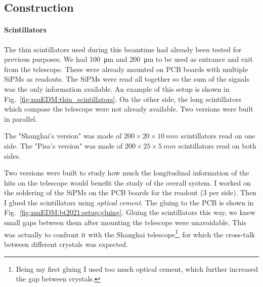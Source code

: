 \begin{refsection}
    \subsection{Construction}
        \paragraph{Scintillators}
        The thin scintillators used during this beamtime had already been tested for previous purposes. 
        We had \SI{100}{\micro m} and \SI{200}{\micro m} to be used as entrance and exit from the telescope.
        These were already mounted on PCB boards with multiple SiPMs as readouts. The SiPMs were read all together so the sum of the signals was the only information available.
        An example of this setup is shown in Fig.~\ref{fig:muEDM:thin_scintillators}.
        On the other side, the long scintillators which compose the telescope were not already available.
        Two versions were built in parallel.
        \begin{outline}
            \1 The "Shanghai's version" was made of $200\times 20\times\SI{10}{mm}$ scintillators read on one side.
            \1 The "Pisa's version" was made of $200\times 25\times\SI{5}{mm}$ scintillators read on both sides.
        \end{outline}
        Two versions were built to study how much the longitudinal information of the hits on the telescope would benefit the study of the overall system.
        I worked on the soldering of the SiPMs on the PCB boards for the readout (3 per side).
        Then I glued the scintillators using \textit{optical cement}.
        The gluing to the PCB is shown in Fig.~\ref{fig:muEDM:bt2021:setup:gluing}.
        Gluing the scintillators this way, we knew small gaps between them after mounting the telescope were unavoidable. 
        This was actually to confront it with the Shanghai telescope\footnote{Being my first gluing I used too much optical cement, which further increased the gap between crystals.}, for which the cross-talk between different crystals was expected.


\end{refsection}
